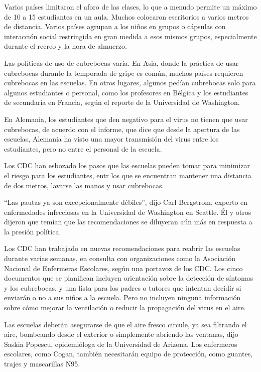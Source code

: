 Varios países limitaron el aforo de las clases, lo que a menudo permite
un máximo de 10 a 15 estudiantes en un aula. Muchos colocaron
escritorios a varios metros de distancia. Varios países agrupan a los
niños en grupos o cápsulas con interacción social restringida en gran
medida a esos mismos grupos, especialmente durante el recreo y la hora
de almuerzo.

Las políticas de uso de cubrebocas varía. En Asia, donde la práctica de
usar cubrebocas durante la temporada de gripe es común, muchos países
requieren cubrebocas en las escuelas. En otros lugares, algunos pedían
cubrebocas solo para algunos estudiantes o personal, como los profesores
en Bélgica y los estudiantes de secundaria en Francia, según el reporte
de la Universidad de Washington.

En Alemania, los estudiantes que den negativo para el virus no tienen
que usar cubrebocas, de acuerdo con el informe, que dice que desde la
apertura de las escuelas, Alemania ha visto una mayor transmisión del
virus entre los estudiantes, pero no entre el personal de la escuela.

Los CDC han esbozado los pasos que las escuelas pueden tomar para
minimizar el riesgo para los estudiantes, entr los que se encuentran
mantener una distancia de dos metros, lavarse las manos y usar
cubrebocas.

``Las pautas ya son excepcionalmente débiles'', dijo Carl Bergstrom,
experto en enfermedades infecciosas en la Universidad de Washington en
Seattle. Él y otros dijeron que temían que las recomendaciones se
diluyeran aún más en respuesta a la presión política.

Los CDC han trabajado en nuevas recomendaciones para reabrir las
escuelas durante varias semanas, en consulta con organizaciones como la
Asociación Nacional de Enfermeras Escolares, según una portavoz de los
CDC. Los cinco documentos que se planifican incluyen orientación sobre
la detección de síntomas y los cubrebocas, y una lista para los padres o
tutores que intentan decidir si enviarán o no a sus niños a la escuela.
Pero no incluyen ninguna información sobre cómo mejorar la ventilación o
reducir la propagación del virus en el aire.

Las escuelas deberán asegurarse de que el aire fresco circule, ya sea
filtrando el aire, bombeando desde el exterior o simplemente abriendo
las ventanas, dijo Saskia Popescu, epidemióloga de la Universidad de
Arizona. Los enfermeros escolares, como Cogan, también necesitarán
equipo de protección, como guantes, trajes y mascarillas N95.

